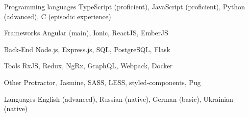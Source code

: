

\begin{cvskills}

  \cvskill
    {Programming languages} %
    {TypeScript (proficient), JavaScript (proficient), Python (advanced), C (episodic experience)} %

  \cvskill
    {Frameworks} %
    {Angular (main), Ionic, ReactJS, EmberJS} %
    

  \cvskill
    {Back-End} %
    {Node.js, Express.js, SQL, PostgreSQL, Flask} %

  \cvskill
    {Tools} %
    {RxJS, Redux, NgRx, GraphQL, Webpack, Docker } %

    
  \cvskill
    {Other} %
    {Protractor, Jasmine, SASS, LESS, styled-components, Pug} %

  \cvskill
    {Languages} %
    {English (advanced), Russian (native), German (basic), Ukrainian (native)} %

\end{cvskills}

